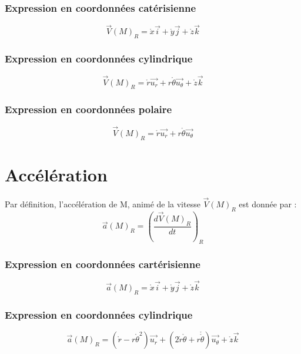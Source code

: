 \subsubsection{Expression en coordonnées catérisienne}
$$\overrightarrow{V}(M)_R = \mathring{x}\overrightarrow{i} + \mathring{y}\overrightarrow{j} + \mathring{z} \overrightarrow{k}$$
\subsubsection{Expression en coordonnées cylindrique}
$$\overrightarrow{V}(M)_R = \mathring{r}\overrightarrow{u_r} + r\mathring{\theta}\overrightarrow{u_{\theta}} + \mathring{z} \overrightarrow{k}$$
\subsubsection{Expression en coordonnées polaire}
$$\overrightarrow{V}(M)_R = \mathring{r}\overrightarrow{u_r} + r\mathring{\theta}\overrightarrow{u_{\theta}}$$
\section{Accélération}
\begin{de}
Par définition, l'accélération de M, animé de la vitesse $\overrightarrow{V}(M)_R$ est donnée par :
$$\overrightarrow{a}(M)_R = \left( \dfrac{d\overrightarrow{V}(M)_R}{dt}\right)_R $$
\end{de}
\subsubsection{Expression en coordonnées cartérisienne}
$$\overrightarrow{a}(M)_R = \mathring{x}\mathring{}\overrightarrow{i} + \mathring{y}\mathring{}\overrightarrow{j} + \mathring{z}\mathring{} \overrightarrow{k}$$
\subsubsection{Expression en coordonnées cylindrique}
$$\overrightarrow{a}(M)_R = (\mathring{r}\mathring{} - r\mathring{\theta}^2)\overrightarrow{u_r} + (2\mathring{r}\mathring{\theta} + r\mathring{\mathring{\theta}})\overrightarrow{u_{\theta}} + \mathring{z}\mathring{}\overrightarrow{k}$$
